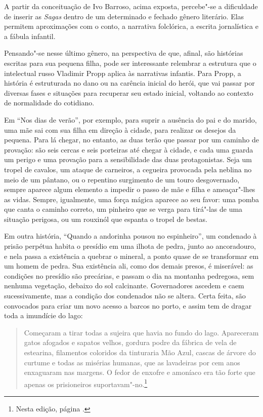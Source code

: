 A partir da conceituação de Ivo Barroso, acima exposta, percebe"-se a dificuldade de inserir as \textit{Sagas} dentro de um determinado e fechado gênero literário. Elas permitem aproximações com o conto, a narrativa folclórica, a escrita jornalística e a fábula infantil. 

Pensando"-se nesse último gênero, na perspectiva de que, afinal, são histórias escritas para sua pequena filha, pode ser interessante relembrar a estrutura que o intelectual russo Vladimir Propp aplica às narrativas infantis. Para Propp, a história é estruturada no dano ou na carência inicial do herói, que vai passar por diversas fases e situações para recuperar seu estado inicial, voltando ao contexto de normalidade do cotidiano.

Em ``Nos dias de verão'', por exemplo, para suprir a ausência do pai e do marido, uma mãe sai com sua filha em direção à cidade, para realizar os desejos da pequena. Para lá chegar, no entanto, as duas terão que passar por um caminho de provação: são seis cercas e seis porteiras até chegar à cidade, e cada uma guarda um perigo e uma provação para a sensibilidade das duas protagonistas. Seja um tropel de cavalos, um ataque de carneiros, a cegueira provocada pela neblina no meio de um pântano, ou o repentino surgimento de um touro desgovernado, sempre aparece algum elemento a impedir o passo de mãe e filha e ameaçar"-lhes as vidas. Sempre, igualmente, uma força mágica aparece ao seu favor: uma pomba que canta o caminho correto, um pinheiro que se verga para tirá"-las de uma situação perigosa, ou um rouxinól que espanta o tropel de bestas.

Em outra história, ``Quando a
andorinha pousou no espinheiro'',  um condenado à prisão perpétua habita
o presídio em uma ilhota de pedra, junto ao ancoradouro, e nela passa a
existência a quebrar o mineral, a ponto quase de se transformar em um homem de pedra. Sua existência ali, como dos demais presos, é miserável: as condições no presídio são precárias, e passam o dia na montanha pedregosa, sem nenhuma vegetação, debaixo do sol calcinante. Governadores ascedem e caem sucessivamente, mas a condição dos condenados não se altera. Certa feita, são convocados para criar um novo acesso a barcos no porto, e assim tem de dragar toda a imundície do lago:

\begin{quote}
Começaram a tirar todas a sujeira que havia no fundo do lago. Apareceram
gatos afogados e sapatos velhos, gordura podre da fábrica de vela de
estearina, filamentos coloridos da tinturaria Mão Azul, cascas de
árvore do curtume e todas as misérias humanas, que as lavadeiras por
cem anos enxaguaram nas margens. O fedor de enxofre e amoníaco era tão
forte que apenas os prisioneiros suportavam"-no.\footnote{Nesta edição, página \pageref{lago}.}
\end{quote}

